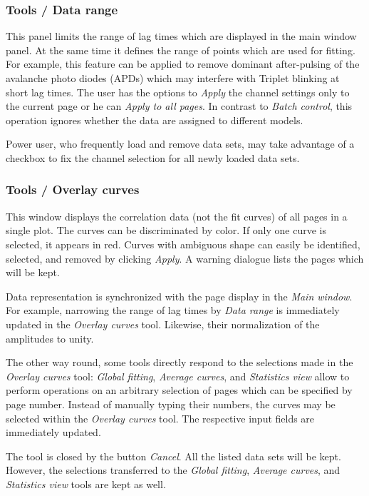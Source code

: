 \subsubsection{Tools / Data range}
\label{sec:menub.tools.datar}
This panel limits the range of lag times which are displayed in the main window panel. At the same time it defines the range of points which are used for fitting. For example, this feature can be applied to remove dominant after-pulsing of the avalanche photo diodes (APDs) which may interfere with Triplet blinking at short lag times. The user has the options to \textit{Apply} the channel settings only to the current page or he can \textit{Apply to all pages}. In contrast to \textit{Batch control}, this operation ignores whether the data are assigned to different models. 

Power user, who frequently load and remove data sets, may take advantage of a checkbox to fix the channel selection for all newly loaded data sets.

\subsubsection{Tools / Overlay curves}
\label{sec:menub.tools.overl}
This window displays the correlation data (not the fit curves) of all pages in a single plot. The curves can be discriminated by color. If only one curve is selected, it appears in red. Curves with ambiguous shape can easily be identified, selected, and removed by clicking \textit{Apply}. A warning dialogue lists the pages which will be kept.

Data representation is synchronized with the page display in the \textit{Main window}. For example, narrowing the range of lag times by \textit{Data range }is immediately updated in the \textit{Overlay curves }tool. Likewise, their normalization of the amplitudes to unity.

The other way round, some tools directly respond to the selections made in the \textit{Overlay curves} tool: \textit{Global fitting}, \textit{Average curves}, and \textit{Statistics view} allow to perform operations on an arbitrary selection of pages which can be specified by page number. Instead of manually typing their numbers, the curves may be selected within the \textit{Overlay curves} tool. The respective input fields are immediately updated.

The tool is closed by the button \textit{Cancel}. All the listed data sets will be kept. However, the selections transferred to the \textit{Global fitting}, \textit{Average curves}, and \textit{Statistics view} tools are kept as well.

